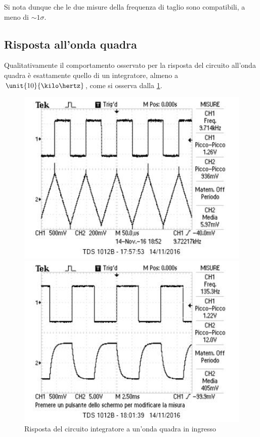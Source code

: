 \documentclass[10pt,a4paper]{article}
\begin{document}
Si nota dunque che le due misure della frequenza di taglio sono compatibili, a meno di $\sim 1\sigma$.

\subsection{Risposta all'onda quadra}

Qualitativamente il comportamento osservato per la risposta del circuito all'onda quadra è esattamente quello di un integratore, almeno a $\unit{10}{\kilo\hertz}$, come si osserva dalla \figurename{\ref{fig:intsq}}.

\begin{figure}[h!]
	\begin{minipage}[t]{0.45\textwidth}
		\centering
		\includegraphics[width=1\textwidth]{../oscilloscopio/sqint.jpg}
	\end{minipage}
	\begin{minipage}[t]{0.45\textwidth}
		\centering
		\includegraphics[width=1\textwidth]{../oscilloscopio/sqexp.jpg}
	\end{minipage}
	\caption{Risposta del circuito integratore a un'onda quadra in ingresso}
	\label{fig:intsq}
\end{figure}
\end{document}
